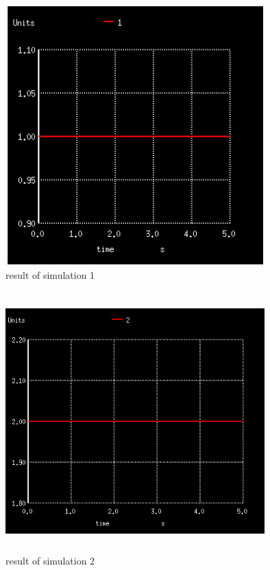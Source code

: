 \documentclass{report}
\begin{document}
 \begin{center}
 
 \begin{figure}[!tb]
    \includegraphics[width=10cm,height=10cm,keepaspectratio]{011.png}
    \caption{result of simulation 1}
\end{figure}

 \begin{figure}[!tb]
    \includegraphics[width=10cm,height=10cm,keepaspectratio]{012.png}
    \caption{result of simulation 2}
\end{figure}

\end{center}
\end{document}
